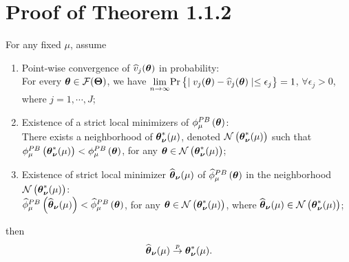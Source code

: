 \section{Proof of Theorem 1.1.2}
\begin{theorem}
	For any fixed $\mu$, assume 
	\begin{enumerate}
		\item Point-wise convergence of $\widehat{v}_j(\boldsymbol{\theta})$ in probability:\\ For every $ \boldsymbol{\theta} \in \mathcal{F}(\boldsymbol{\Theta})$, we have $ \underset{n \to \infty}{\lim} \text{Pr} \left\{ \mid v_j(\boldsymbol{\theta}) - \widehat{v}_j(\boldsymbol{\theta}) \mid \le \epsilon_j \right\}  = 1$, $\forall \epsilon_j > 0$, where $j = 1, \cdots, J$;
		\item Existence of a strict local minimizers of $\phi^{PB}_{\mu}\left(\boldsymbol{\theta}\right)$:\\
		There exists a neighborhood of $\boldsymbol{\theta}^{*}_{\boldsymbol{\nu}}(\mu)$, denoted $\mathcal{N}\left(\boldsymbol{\theta}^{*}_{\boldsymbol{\nu}}(\mu)\right)$ such that $\phi^{PB}_{\mu}\left(\boldsymbol{\theta}^{*}_{\boldsymbol{\nu}}(\mu)\right) < \phi^{PB}_{\mu}\left(\boldsymbol{\theta}\right)$, for any $\boldsymbol{\theta} \in \mathcal{N}\left(\boldsymbol{\theta}^{*}_{\boldsymbol{\nu}}(\mu)\right)$;
		\item Existence of strict local minimizer $\widehat{\boldsymbol{\theta}}_{\boldsymbol{\nu}}(\mu)$ of $\widehat{\phi}^{PB}_{\mu}\left(\boldsymbol{\theta}\right)$ in the neighborhood $\mathcal{N}\left(\boldsymbol{\theta}^{*}_{\boldsymbol{\nu}}(\mu)\right)$:\\  
		$ \widehat{\phi}^{PB}_{\mu}\left(\widehat{\boldsymbol{\theta}}_{\boldsymbol{\nu}}(\mu)\right) < \widehat{\phi}^{PB}_{\mu}\left(\boldsymbol{\theta}\right)$, for any $\boldsymbol{\theta} \in \mathcal{N}\left(\boldsymbol{\theta}^{*}_{\boldsymbol{\nu}}(\mu)\right)$, where $\widehat{\boldsymbol{\theta}}_{\boldsymbol{\nu}}(\mu) \in \mathcal{N}\left(\boldsymbol{\theta}^{*}_{\boldsymbol{\nu}}(\mu)\right)$;
	\end{enumerate} then 
	$$\widehat{\boldsymbol{\theta}}_{\boldsymbol{\nu}}(\mu) \overset{p}{\to} \boldsymbol{\theta}^{*}_{\boldsymbol{\nu}}(\mu).$$
	
\end{theorem}

